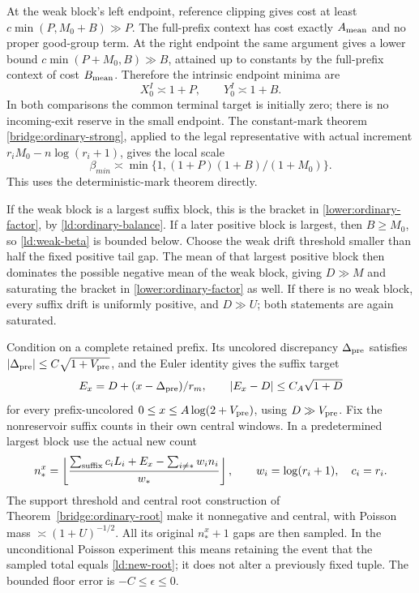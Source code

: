 At the weak block's left endpoint, reference clipping gives cost
at least \(c\min(P,M_0+B)\gg P\).  The full-prefix context has
cost exactly \(A_{\rm mean}\) and no proper good-group term.
At the right endpoint the same argument gives a lower bound
\(c\min(P+M_0,B)\gg B\), attained up to constants by the
full-prefix context of cost \(B_{\rm mean}\).  Therefore the
intrinsic endpoint minima are
\begin{equation}
 X_0^I\asymp1+P,\qquad Y_0^I\asymp1+B.
 \label{ld:ordinary-small-boxes}
\end{equation}
In both comparisons the common terminal target is initially zero;
there is no incoming-exit reserve in the small endpoint.
The constant-mark theorem \ref{bridge:ordinary-strong}, applied
to the legal representative with actual increment
\(r_iM_0-n\log(r_i+1)\), gives the local scale
\begin{equation}
 \beta_{min}\asymp
     \min\{1,(1+P)(1+B)/(1+M_0)\}.
 \label{ld:weak-beta}
\end{equation}
This uses the deterministic-mark theorem directly.

If the weak block is a largest suffix block, this is the bracket in
\eqref{lower:ordinary-factor}, by \eqref{ld:ordinary-balance}.
If a later positive block is largest, then \(B\ge M_0\), so
\eqref{ld:weak-beta} is bounded below.  Choose the weak drift
threshold smaller than half the fixed positive tail gap.  The mean
of that largest positive block then dominates the possible negative
mean of the weak block, giving \(D\gg M\) and saturating the
bracket in \eqref{lower:ordinary-factor} as well.  If there is no
weak block, every suffix drift is uniformly positive, and
\(D\gg U\); both statements are again saturated.

Condition on a complete retained prefix.  Its uncolored discrepancy
\(\Delta_{\rm pre}\) satisfies
\(|\Delta_{\rm pre}|\le C\sqrt{1+V_{\rm pre}}\), and the Euler
identity gives the suffix target
\begin{equation}
 E_x=D+(x-\Delta_{\rm pre})/r_m,\qquad
 |E_x-D|\le C_A\sqrt{1+D}
 \label{ld:root-target}
\end{equation}
for every prefix-uncolored
\(0\le x\le A\log(2+V_{\rm pre})\), using
\(D\gg V_{\rm pre}\).  Fix the nonreservoir suffix counts in
their own central windows.  In a predetermined largest block use
the actual new count
\begin{equation}
 n_*^x=\left\lfloor
 \frac{\sum_{\rm suffix}c_iL_i+E_x-
                \sum_{i\ne *}w_in_i}{w_*}\right\rfloor,
 \qquad w_i=\log(r_i+1),\quad c_i=r_i.
 \label{ld:new-root}
\end{equation}
The support threshold and central root construction of
Theorem~\ref{bridge:ordinary-root} make it nonnegative and central,
with Poisson mass \(\asymp(1+U)^{-1/2}\).  All its original
\(n_*^x+1\) gaps are then sampled.  In the unconditional Poisson
experiment this means retaining the event that the sampled total
equals \eqref{ld:new-root}; it does not alter a previously fixed
tuple.  The bounded floor error is \(-C\le\epsilon\le0\).

